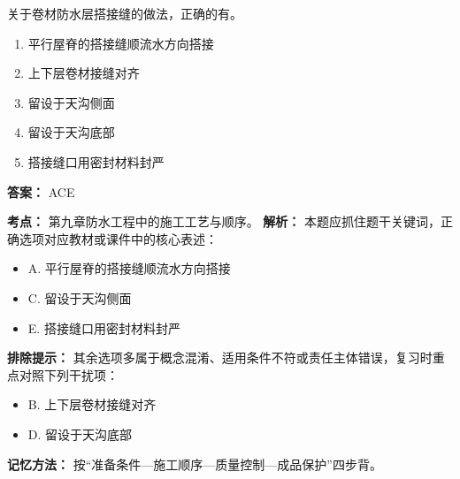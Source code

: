 \documentclass[UTF8,fontset=fandol,11pt]{ctexart}
\begin{document}
\begin{quizbox}[title={第 6 题}]
关于卷材防水层搭接缝的做法，正确的有。\\
\begin{enumerate}[label=\Alph*.]
\item 平行屋脊的搭接缝顺流水方向搭接
\item 上下层卷材接缝对齐
\item 留设于天沟侧面
\item 留设于天沟底部
\item 搭接缝口用密封材料封严
\end{enumerate}
\textbf{答案：} ACE
\vspace{0.25em}
\begin{answerbox}[title={考点解析}]
\textbf{考点：} 第九章防水工程中的施工工艺与顺序。
\textbf{解析：} 本题应抓住题干关键词，正确选项对应教材或课件中的核心表述：
\begin{itemize}
\item A. 平行屋脊的搭接缝顺流水方向搭接
\item C. 留设于天沟侧面
\item E. 搭接缝口用密封材料封严
\end{itemize}
\textbf{排除提示：} 其余选项多属于概念混淆、适用条件不符或责任主体错误，复习时重点对照下列干扰项：
\begin{itemize}
\item B. 上下层卷材接缝对齐
\item D. 留设于天沟底部
\end{itemize}
\textbf{记忆方法：} 按“准备条件—施工顺序—质量控制—成品保护”四步背。
\end{answerbox}
\end{quizbox}
\end{document}
